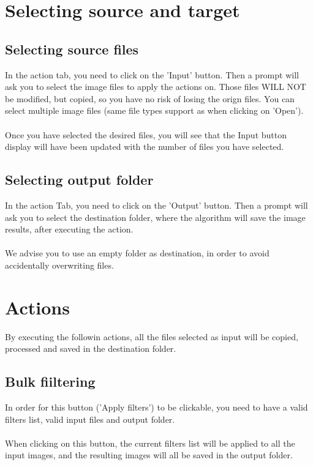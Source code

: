 \documentclass[12pt,a4paper]{article}
\begin{document}
\section{Selecting source and target}

\subsection{Selecting source files}

In the action tab, you need to click on the 'Input' button. Then a prompt will ask you to select the image files to apply the actions on. Those files WILL NOT be modified, but copied, so you have no risk of losing the orign files.
You can select multiple image files (same file types support as when clicking on 'Open').\\
~\\
Once you have selected the desired files, you will see that the Input button display will have been updated with the number of files you have selected.

\subsection{Selecting output folder}

In the action Tab, you need to click on the 'Output' button. Then a prompt will ask you to select the destination folder, where the algorithm will save the image results, after executing the action.\\
~\\
We advise you to use an empty folder as destination, in order to avoid accidentally overwriting files.

\section{Actions}

By executing the followin actions, all the files selected as input will be copied, processed and saved in the destination folder.

\subsection{Bulk fiiltering}

In order for this button ('Apply filters') to be clickable, you need to have a valid filters list, valid input files and output folder.\\
~\\
When clicking on this button, the current filters list will be applied to all the input images, and the resulting images will all be saved in the output folder.
\end{document}
